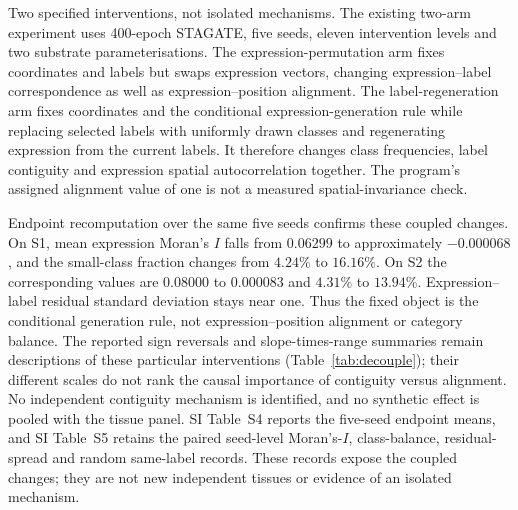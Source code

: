 \documentclass[journal]{IEEEtran}
\begin{document}
Two specified interventions, not isolated mechanisms. The existing two-arm experiment uses 400-epoch STAGATE, five seeds, eleven intervention levels and two substrate parameterisations. The expression-permutation arm fixes coordinates and labels but swaps expression vectors, changing expression--label correspondence as well as expression--position alignment. The label-regeneration arm fixes coordinates and the conditional expression-generation rule while replacing selected labels with uniformly drawn classes and regenerating expression from the current labels. It therefore changes class frequencies, label contiguity and expression spatial autocorrelation together. The program's assigned alignment value of one is not a measured spatial-invariance check.

Endpoint recomputation over the same five seeds confirms these coupled changes. On S1, mean expression Moran's $I$ falls from $0.06299$ to approximately $-0.000068$, and the small-class fraction changes from $4.24\%$ to $16.16\%$. On S2 the corresponding values are $0.08000$ to $0.000083$ and $4.31\%$ to $13.94\%$. Expression--label residual standard deviation stays near one. Thus the fixed object is the conditional generation rule, not expression--position alignment or category balance. The reported sign reversals and slope-times-range summaries remain descriptions of these particular interventions (Table~\ref{tab:decouple}); their different scales do not rank the causal importance of contiguity versus alignment. No independent contiguity mechanism is identified, and no synthetic effect is pooled with the tissue panel.
SI Table~S4 reports the five-seed endpoint means, and SI Table~S5 retains
the paired seed-level Moran's-$I$, class-balance, residual-spread and random
same-label records. These records expose the coupled changes; they are not
new independent tissues or evidence of an isolated mechanism.
\end{document}
